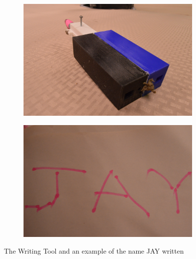 \documentclass[letterpaper]{article}
\begin{document}
\begin{figure}[t]
\centering
\begin{subfigure}{.48\linewidth}
\includegraphics[width=\linewidth]{thetool.jpg}
\end{subfigure}
\hfill
\begin{subfigure}{.48\linewidth}
\includegraphics[width=\linewidth]{jay.jpg}
\end{subfigure}
\caption{The Writing Tool and an example of the name JAY written}
\label{tool}
\end{figure}
\end{document}
